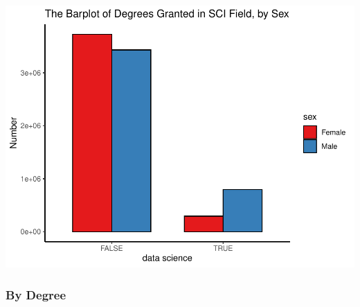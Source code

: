 \documentclass[
  12pt,
]{article}
\begin{document}
\includegraphics{hw1_sol_files/figure-latex/unnamed-chunk-11-1.pdf}

\hypertarget{by-degree}{%
\subsubsection{By Degree}\label{by-degree}}
\end{document}
